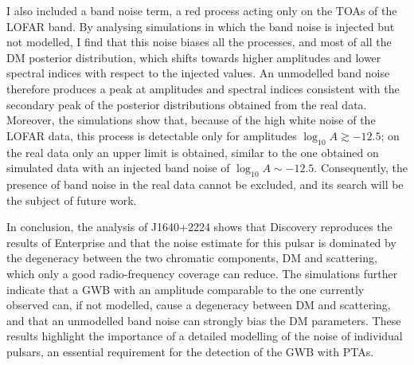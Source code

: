 \documentclass[12pt]{report}
\begin{document}
I also included a band noise term, a red process acting only on the TOAs of the
LOFAR band. By analysing simulations in which the band noise is injected but not
modelled, I find that this noise biases all the processes, and most of all the
DM posterior distribution, which shifts towards higher amplitudes and lower
spectral indices with respect to the injected values. An unmodelled band noise
therefore produces a peak at amplitudes and spectral indices consistent with the
secondary peak of the posterior distributions obtained from the real data.
Moreover, the simulations show that, because of the high white noise of the
LOFAR data, this process is detectable only for amplitudes
$\log_{10}A \gtrsim -12.5$; on the real data only an upper limit is obtained,
similar to the one obtained on simulated data with an injected band noise of
$\log_{10}A \sim -12.5$. Consequently, the presence of band noise in the real
data cannot be excluded, and its search will be the subject of future work. \par

In conclusion, the analysis of J1640+2224 shows that Discovery reproduces the
results of Enterprise and that the noise estimate for this pulsar is dominated
by the degeneracy between the two chromatic components, DM and scattering, which
only a good radio-frequency coverage can reduce. The simulations further
indicate that a GWB with an amplitude comparable to the one currently observed
can, if not modelled, cause a degeneracy between DM and scattering, and that an
unmodelled band noise can strongly bias the DM parameters. These results
highlight the importance of a detailed modelling of the noise of individual
pulsars, an essential requirement for the detection of the GWB with PTAs. \par
\end{document}
